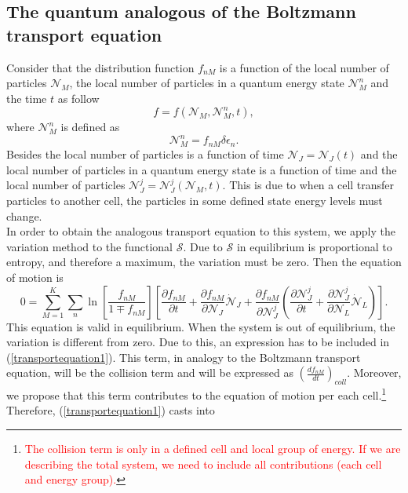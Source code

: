 \documentclass{article}
\newcommand{\Ss}{\mathcal{S}}
\begin{document}
  \subsection{The quantum analogous of the Boltzmann transport equation}
Consider that the distribution function $f_{nM}$ is a function of the local number of particles $\mathcal{N}_M$, the local number of particles in a quantum energy state $\mathcal{N}_{M}^{n}$ and the time $t$ as follow
\begin{equation}
    f=f(\mathcal{N}_M,\mathcal{N}_M^{n},t),
\end{equation}
where $\mathcal{N}_{M}^{n}$ is defined as
\begin{equation}
    \mathcal{N}_{M}^{n}= f_{nM} \delta \epsilon_n.
\end{equation}
Besides the local number of particles is a function of time $\mathcal{N}_J=\mathcal{N}_J(t)$ and the local number of particles in a quantum energy state is a function of time and the local number of particles $\mathcal{N}_J^{j}=\mathcal{N}_J^{j}(\mathcal{N}_M,t)$. This is due to when a cell transfer particles to another cell, the particles in some defined state energy levels must change.\\
In order to obtain the analogous transport equation to this system, we apply the variation method to the functional $\Ss$. Due to $\Ss$ in equilibrium is proportional to entropy, and therefore a maximum, the variation must be zero. Then the equation of motion is
\begin{equation}
    0=\sum_{M=1}^{K} \sum_n \ln \left[ \frac{f_{nM}}{1\mp f_{nM}} \right] \left[ \frac{\partial f_{nM}}{\partial t}+\frac{\partial f_{nM}}{\partial \mathcal{N}_J}\dot{\mathcal{N}}_J+\frac{\partial f_{nM}}{\partial \mathcal{N}_J^{j}}\left( \frac{\partial \mathcal{N}_J^{j}}{\partial t}+\frac{\partial \mathcal{N}_J^{j}}{\partial \mathcal{N}_L}\dot{\mathcal{N}}_L \right) \right]. \label{transportequation1}
\end{equation}
This equation is valid in equilibrium. When the system is out of equilibrium, the variation is different from zero. Due to this, an expression has to be included in (\ref{transportequation1}). This term, in analogy to the Boltzmann transport equation, will be the collision term and will be expressed as $\left( \frac{df_{nM}}{dt} \right)_{coll}$. Moreover, we propose that this term contributes to the equation of motion per each cell.\footnote{\textcolor{red}{The collision term is only in a defined cell and local group of energy. If we are describing the total system, we need to include all contributions (each cell and energy group).}} Therefore, (\ref{transportequation1}) casts into
\end{document}
